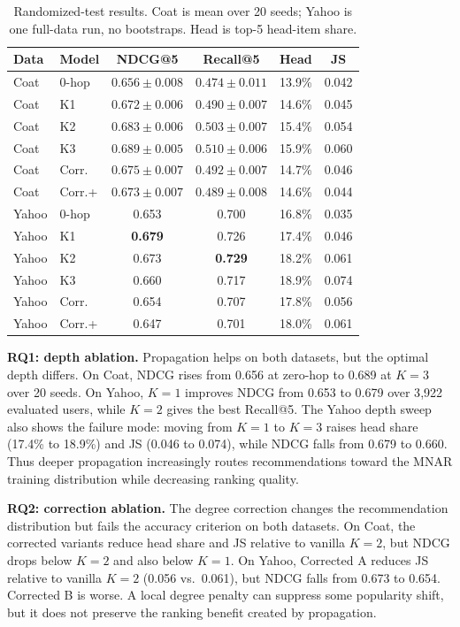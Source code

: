 \documentclass[10pt]{article}
\begin{document}
\begin{table}[t]
\centering
\small
\caption{Randomized-test results. Coat is mean over 20 seeds; Yahoo is one full-data run, no bootstraps. Head is top-5 head-item share.}
\label{tab:main}
\begin{tabular}{llcccc}
\toprule
Data & Model & NDCG@5 & Recall@5 & Head & JS \\
\midrule
Coat & 0-hop & $0.656\pm0.008$ & $0.474\pm0.011$ & 13.9\% & 0.042 \\
Coat & K1 & $0.672\pm0.006$ & $0.490\pm0.007$ & 14.6\% & 0.045 \\
Coat & K2 & $0.683\pm0.006$ & $0.503\pm0.007$ & 15.4\% & 0.054 \\
Coat & K3 & $\mathbf{0.689\pm0.005}$ & $\mathbf{0.510\pm0.006}$ & 15.9\% & 0.060 \\
Coat & Corr. & $0.675\pm0.007$ & $0.492\pm0.007$ & 14.7\% & 0.046 \\
Coat & Corr.+ & $0.673\pm0.007$ & $0.489\pm0.008$ & 14.6\% & 0.044 \\
\midrule
Yahoo & 0-hop & 0.653 & 0.700 & 16.8\% & 0.035 \\
Yahoo & K1 & \textbf{0.679} & 0.726 & 17.4\% & 0.046 \\
Yahoo & K2 & 0.673 & \textbf{0.729} & 18.2\% & 0.061 \\
Yahoo & K3 & 0.660 & 0.717 & 18.9\% & 0.074 \\
Yahoo & Corr. & 0.654 & 0.707 & 17.8\% & 0.056 \\
Yahoo & Corr.+ & 0.647 & 0.701 & 18.0\% & 0.061 \\
\bottomrule
\end{tabular}
\end{table}

\textbf{RQ1: depth ablation.} Propagation helps on both datasets, but the optimal depth differs. On Coat, NDCG rises from 0.656 at zero-hop to 0.689 at $K=3$ over 20 seeds. On Yahoo, $K=1$ improves NDCG from 0.653 to 0.679 over 3{,}922 evaluated users, while $K=2$ gives the best Recall@5. The Yahoo depth sweep also shows the failure mode: moving from $K=1$ to $K=3$ raises head share (17.4\% to 18.9\%) and JS (0.046 to 0.074), while NDCG falls from 0.679 to 0.660. Thus deeper propagation increasingly routes recommendations toward the MNAR training distribution while decreasing ranking quality.

\textbf{RQ2: correction ablation.} The degree correction changes the recommendation distribution but fails the accuracy criterion on both datasets. On Coat, the corrected variants reduce head share and JS relative to vanilla $K=2$, but NDCG drops below $K=2$ and also below $K=1$. On Yahoo, Corrected A reduces JS relative to vanilla $K=2$ (0.056 vs.\ 0.061), but NDCG falls from 0.673 to 0.654. Corrected B is worse. A local degree penalty can suppress some popularity shift, but it does not preserve the ranking benefit created by propagation.
\end{document}
